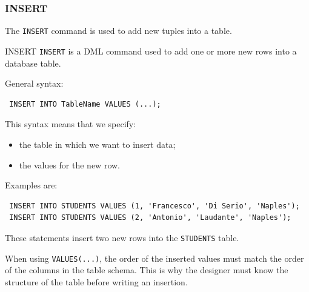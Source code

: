  \subsubsection{INSERT}

 The \texttt{INSERT} command is used to add new tuples into a table.

 \begin{defbox}{INSERT}
  \texttt{INSERT} is a DML command used to add one or more new rows into a database table.
 \end{defbox}

 General syntax:

 \begin{verbatim}
 INSERT INTO TableName VALUES (...);
 \end{verbatim}
 \vspace{-0.4cm}

 This syntax means that we specify:
 \begin{itemize}
  \item the table in which we want to insert data;
  \item the values for the new row.
 \end{itemize}

  Examples  are:

 \begin{verbatim}
 INSERT INTO STUDENTS VALUES (1, 'Francesco', 'Di Serio', 'Naples');
 INSERT INTO STUDENTS VALUES (2, 'Antonio', 'Laudante', 'Naples');
 \end{verbatim}
 \vspace{-0.4cm}

 These statements insert two new rows into the \texttt{STUDENTS} table.

 When using \texttt{VALUES(...)}, the order of the inserted values must match the order of the columns in the table schema. This is why the designer must know the structure of the table before writing an insertion.

 \vs

